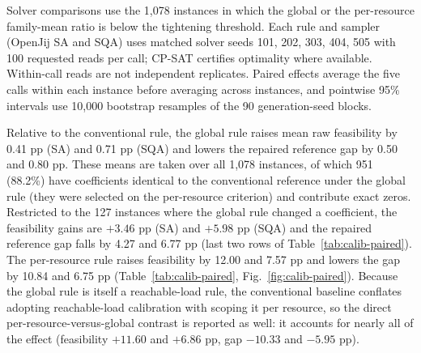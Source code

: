 \documentclass[10pt,a4paper]{article}
\begin{document}
Solver comparisons use the 1{,}078 instances in which the global or the
per-resource family-mean ratio is below the tightening threshold.
Each rule and sampler (OpenJij SA and SQA) uses matched solver seeds
101, 202, 303, 404, 505 with 100 requested reads per call; CP-SAT
certifies optimality where available.  Within-call reads are not
independent replicates.  Paired effects average the five calls within
each instance before averaging across instances, and pointwise 95\%
intervals use 10{,}000 bootstrap resamples of the 90 generation-seed
blocks.

Relative to the conventional rule, the global rule raises mean raw
feasibility by 0.41 pp (SA) and 0.71 pp (SQA) and lowers the repaired
reference gap by 0.50 and 0.80 pp.  These means are taken over all
1{,}078 instances, of which 951 (88.2\%) have coefficients identical to
the conventional reference under the global rule (they were selected on
the per-resource criterion) and contribute exact zeros.  Restricted to
the 127 instances where the global rule changed a coefficient, the
feasibility gains are $+3.46$ pp (SA) and $+5.98$ pp (SQA) and the
repaired reference gap falls by 4.27 and 6.77 pp (last two rows of
Table~\ref{tab:calib-paired}).  The
per-resource rule raises feasibility by 12.00 and 7.57 pp and lowers
the gap by 10.84 and 6.75 pp (Table~\ref{tab:calib-paired},
Fig.~\ref{fig:calib-paired}).  Because the global rule is itself a
reachable-load rule, the conventional baseline conflates adopting
reachable-load calibration with scoping it per resource, so the direct
per-resource-versus-global contrast is reported as well: it accounts
for nearly all of the effect (feasibility $+11.60$ and $+6.86$ pp, gap
$-10.33$ and $-5.95$ pp).
\end{document}
